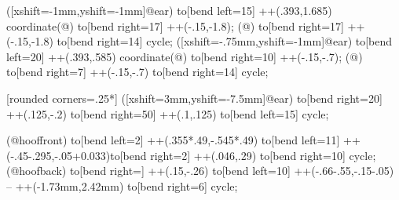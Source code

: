 {%
\if@pingu@@horse@@donkey@
{} ([xshift=-1mm,yshift=-1mm]@ear) to[bend left=15] ++(.393,1.685) coordinate(@) to[bend right=17] ++(-.15,-1.8);
 (@) to[bend right=17] ++(-.15,-1.8) to[bend right=14] cycle;
\else
{} ([xshift=-.75mm,yshift=-1mm]@ear) to[bend left=20] ++(.393,.585) coordinate(@) to[bend right=10] ++(-.15,-.7);
 (@) to[bend right=7] ++(-.15,-.7) to[bend right=14] cycle;
\fi

 [rounded corners=.25*\pingu@@horse@scale] ([xshift=3mm,yshift=-7.5mm]@ear) to[bend right=20] ++(.125,-.2) to[bend right=50] ++(.1,.125) to[bend left=15] cycle;

 (@hooffront) to[bend left=2] ++(.355*.49,-.545*.49) to[bend left=11] ++(-.45-.295,-.05+0.033)to[bend right=2] ++(.046,.29) to[bend right=10] cycle;
 (@hoofback) to[bend right=\fi] ++(.15,-.26) to[bend left=10] ++(\if@pingu@@horse@@donkey@-.66\else-.55\fi,\if@pingu@@horse@@donkey@-.15\else-.05\fi) -- ++(-1.73mm,2.42mm) to[bend right=6] cycle; %
}

\newif\if@pingu@@horse@@donkey@

